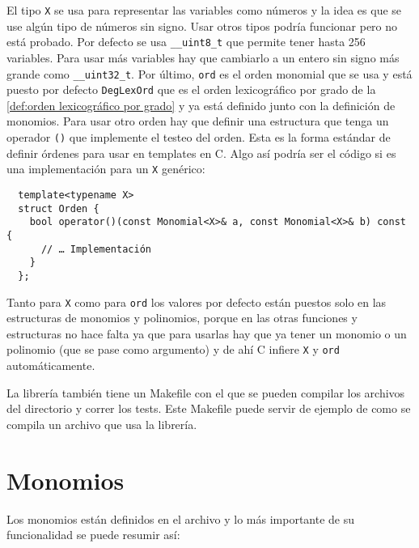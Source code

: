 \documentclass[12pt]{report}
\theoremstyle{customstyle}
\theoremstyle{factstyle}
\newcommand\cpp{C\nolinebreak[4]\hspace{-.05em}\raisebox{.4ex}{\relsize{-3}{\textbf{++}}}\xspace}
\begin{document}
El tipo \texttt{X} se usa para representar las variables como números y la idea es que se use algún tipo de números sin signo. Usar otros tipos podría funcionar pero no está probado. Por defecto se usa \texttt{\_\_uint8\_t} que permite tener hasta 256 variables. Para usar más variables hay que cambiarlo a un entero sin signo más grande como \texttt{\_\_uint32\_t}.
Por último, \texttt{ord} es el orden monomial que se usa y está puesto por defecto \texttt{DegLexOrd} que es el orden lexicográfico por grado de la \cref{def:orden lexicográfico por grado} y ya está definido junto con la definición de monomios. Para usar otro orden hay que definir una estructura que tenga un operador \texttt{()} que implemente el testeo del orden. Esta es la forma estándar de definir órdenes para usar en templates en \cpp. Algo así podría ser el código si es una implementación para un \texttt{X} genérico:

\begin{verbatim}
  template<typename X>
  struct Orden {
    bool operator()(const Monomial<X>& a, const Monomial<X>& b) const {
      // … Implementación
    }
  };
\end{verbatim}

Tanto para \texttt{X} como para \texttt{ord} los valores por defecto están puestos solo en las estructuras de monomios y polinomios, porque en las otras funciones y estructuras no hace falta ya que para usarlas hay que ya tener un monomio o un polinomio (que se pase como argumento) y de ahí \cpp infiere \texttt{X} y \texttt{ord} automáticamente.

La librería también tiene un Makefile con el que se pueden compilar los archivos del directorio  y correr los tests. Este Makefile puede servir de ejemplo de como se compila un archivo que usa la librería.

\section{Monomios}

Los monomios están definidos en el archivo  y lo más importante de su funcionalidad se puede resumir así:
\end{document}
